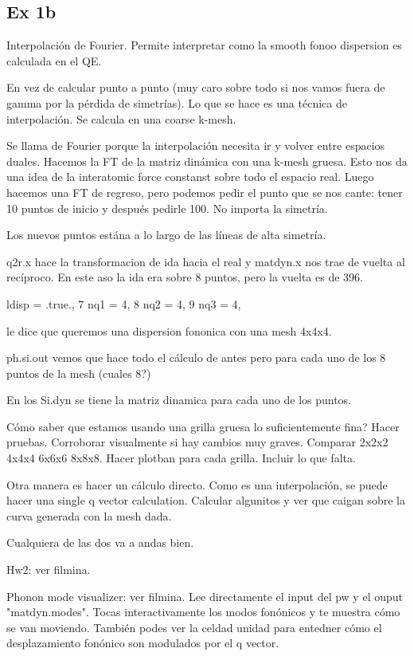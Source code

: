 \subsection{Ex 1b}

  Interpolación de Fourier. Permite interpretar como la smooth fonoo dispersion es calculada en el QE.

  En vez de calcular punto a punto (muy caro sobre todo si nos vamos fuera de gamma por la pérdida de simetrías). Lo que se hace es una técnica de interpolación. Se calcula en una coarse k-mesh.

  Se llama de Fourier porque la interpolación necesita ir y volver entre espacios duales. Hacemos la FT de la matriz dinámica con una k-mesh gruesa. Esto nos da una idea de la interatomic force constanst sobre todo el espacio real. Luego hacemos una FT de regreso, pero podemos pedir el punto que se nos cante: tener 10 puntos de inicio y después pedirle 100. No importa la simetría.

  Los nuevos puntos estána a lo largo de las líneas de alta simetría.

  q2r.x hace la transformacion de ida hacia el real y matdyn.x nos trae de vuelta al recíproco. En este aso la ida era sobre 8 puntos, pero la vuelta es de 396.

  ldisp = .true.,
  7   nq1 = 4,
  8   nq2 = 4,
  9   nq3 = 4,

  le dice que queremos una dispersion fononica con una mesh 4x4x4.

    ph.si.out vemos que hace todo el cálculo de antes pero para cada uno de los 8 puntos de la mesh (cuales 8?)

  En los Si.dyn se tiene la matriz dinamica para cada uno de los puntos.

  Cómo saber que estamos usando una grilla gruesa lo suficientemente fina? Hacer pruebas. Corroborar visualmente si hay cambios muy graves. Comparar 2x2x2 4x4x4 6x6x6 8x8x8. Hacer plotban para cada grilla. Incluir lo que falta.

  Otra manera es hacer un cálculo directo. Como es una interpolación, se puede hacer una single q vector calculation. Calcular algunitos y ver que caigan sobre la curva generada con la mesh dada.

  Cualquiera de las dos va a andas bien.

  Hw2: ver filmina.

  Phonon mode visualizer: ver filmina. Lee directamente el input del pw y el ouput "matdyn.modes". Tocas interactivamente los modos fonónicos y te muestra cómo se van moviendo. También podes ver la celdad unidad para entedner cómo el desplazamiento fonónico son modulados por el q vector.

